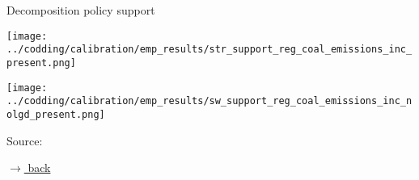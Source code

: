 \documentclass[11pt,aspectratio=169]{beamer}
\newcommand{\tr}[1]{\textcolor{blue}{#1}}
\newcommand{\ar}{$\Rightarrow$ \ }
\begin{document}
	
	
	
	\begin{frame}{Decomposition policy support}
		\vspace{4mm}
		\begin{minipage}[]{0.47\textwidth}
			\texttt{[image: ../codding/calibration/emp\_results/str\_support\_reg\_coal\_emissions\_inc\_present.png]}
		\end{minipage}
		\begin{minipage}[]{0.47\textwidth}
			\texttt{[image: ../codding/calibration/emp\_results/sw\_support\_reg\_coal\_emissions\_inc\_nolgd\_present.png]}
		\end{minipage}
		
		\vspace{0mm}
		\tiny{Source: \cite{CCAM}}
		
		\vspace{8mm}
		\hfill	\hyperlink{wtp}{\tiny{$\rightarrow$ back }}
	\end{frame}
	
\end{document}
